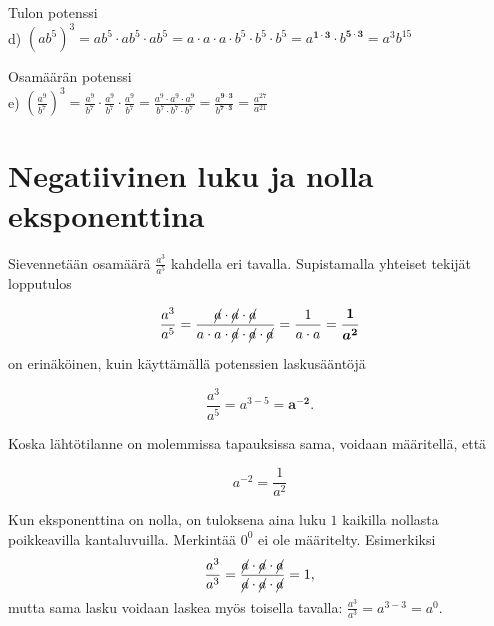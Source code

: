    Tulon potenssi\\
    d) $(ab^5)^3=ab^5\cdot ab^5\cdot ab^5=a\cdot a\cdot a\cdot b^5\cdot b^5\cdot b^5=a^{\mathbf{1\cdot 3}}\cdot b^{\mathbf{5\cdot 3}}=a^3b^{15}$
    
    Osamäärän potenssi\\
    e) $\left(\frac{a^9}{b^7}\right)^3=\frac{a^9}{b^7}\cdot \frac{a^9}{b^7}\cdot \frac{a^9}{b^7}=\frac{a^9\cdot a^9\cdot a^9}{b^7\cdot b^7\cdot b^7}=\frac{a^{\mathbf{9\cdot 3}}}{b^{\mathbf{7\cdot 3}}}=\frac{a^{27}}{a^{21}}$
    
\section*{Negatiivinen luku ja nolla eksponenttina}
    
    Sievennetään osamäärä $\frac{a^3}{a^5}$ kahdella eri tavalla. Supistamalla yhteiset tekijät lopputulos
    
    \begin{equation*}
        \frac{a^3}{a^5} =
        \frac{\cancel{a}\cdot \cancel{a}\cdot \cancel{a}}{a\cdot a\cdot
        \cancel{a}\cdot \cancel{a}\cdot \cancel{a}} = 
        \frac{1}{a\cdot a}=\boldsymbol{\frac{1}{a^2}}
    \end{equation*}
    
    on erinäköinen, kuin käyttämällä potenssien laskusääntöjä
    
    \begin{equation*}
        \frac{a^3}{a^5} = a^{3-5}=\boldsymbol {a^{-2}}{.}
    \end{equation*}
    
    Koska lähtötilanne on molemmissa tapauksissa sama, voidaan määritellä, että
    
    \begin{equation*}
        a^{-2} = \frac{1}{a^2}
    \end{equation*}
    
    
    
    Kun eksponenttina on nolla, on tuloksena aina luku $1$ kaikilla nollasta poikkeavilla kantaluvuilla. Merkintää $0^0$ ei ole määritelty.
    Esimerkiksi
    \[
        \frac{a^3}{a^3}=\frac{\cancel{a}\cdot \cancel{a}\cdot \cancel{a}}{\cancel{a}\cdot \cancel{a}\cdot \cancel{a}}=1,
    \]
    mutta sama lasku voidaan laskea myös toisella tavalla: $\frac{a^3}{a^3}=a^{3-3}=a^0$.
    
